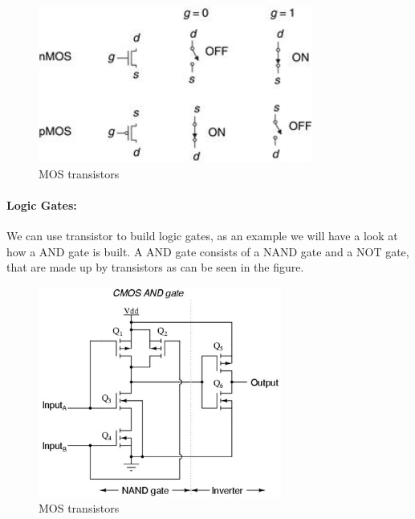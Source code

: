 \documentclass[a4paper]{report}
\begin{document}
\begin{figure}[h]
    \centering
    \includegraphics[width=9cm]{mosfet.jpg}
    \caption{MOS transistors}
\end{figure}

\paragraph{Logic Gates:} We can use transistor to build logic gates, as an example we will have a look at how a AND gate is
built. A AND gate consists of a NAND gate and a NOT gate, that are made up by transistors as can be seen in the figure.

\begin{figure}[h]
    \centering
    \includegraphics[width=8cm]{cmosAnd.jpeg}
    \caption{MOS transistors}
\end{figure}


\end{document}
